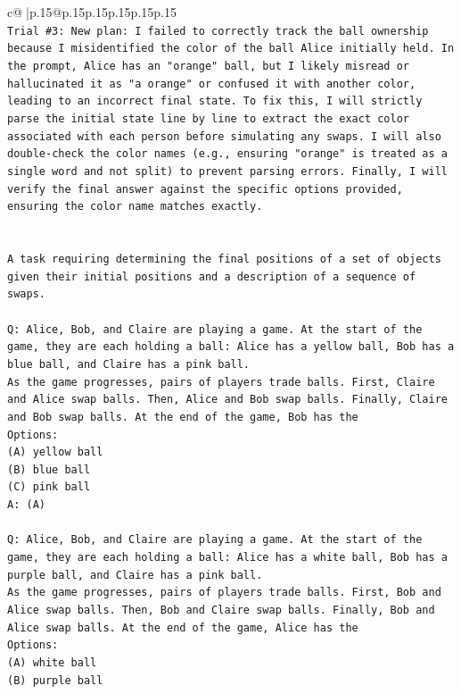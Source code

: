 \documentclass{article}
\begin{document}
{\begin{supertabular}{c@{$\;$}|p{.15\linewidth}@{}p{.15\linewidth}p{.15\linewidth}p{.15\linewidth}p{.15\linewidth}p{.15\linewidth}}
{{{\\ 
\texttt{Trial \#3: New plan: I failed to correctly track the ball ownership because I misidentified the color of the ball Alice initially held. In the prompt, Alice has an "orange" ball, but I likely misread or hallucinated it as "a orange" or confused it with another color, leading to an incorrect final state. To fix this, I will strictly parse the initial state line by line to extract the exact color associated with each person before simulating any swaps. I will also double{-}check the color names (e.g., ensuring "orange" is treated as a single word and not split) to prevent parsing errors. Finally, I will verify the final answer against the specific options provided, ensuring the color name matches exactly.} \\
\\ 
\\ 
\texttt{A task requiring determining the final positions of a set of objects given their initial positions and a description of a sequence of swaps.} \\
\\ 
\texttt{Q: Alice, Bob, and Claire are playing a game. At the start of the game, they are each holding a ball: Alice has a yellow ball, Bob has a blue ball, and Claire has a pink ball.} \\
\texttt{As the game progresses, pairs of players trade balls. First, Claire and Alice swap balls. Then, Alice and Bob swap balls. Finally, Claire and Bob swap balls. At the end of the game, Bob has the} \\
\texttt{Options:} \\
\texttt{(A) yellow ball} \\
\texttt{(B) blue ball} \\
\texttt{(C) pink ball} \\
\texttt{A: (A)} \\
\\ 
\texttt{Q: Alice, Bob, and Claire are playing a game. At the start of the game, they are each holding a ball: Alice has a white ball, Bob has a purple ball, and Claire has a pink ball.} \\
\texttt{As the game progresses, pairs of players trade balls. First, Bob and Alice swap balls. Then, Bob and Claire swap balls. Finally, Bob and Alice swap balls. At the end of the game, Alice has the} \\
\texttt{Options:} \\
\texttt{(A) white ball} \\
\texttt{(B) purple ball} \\
}}}
\end{supertabular}}
\end{document}
